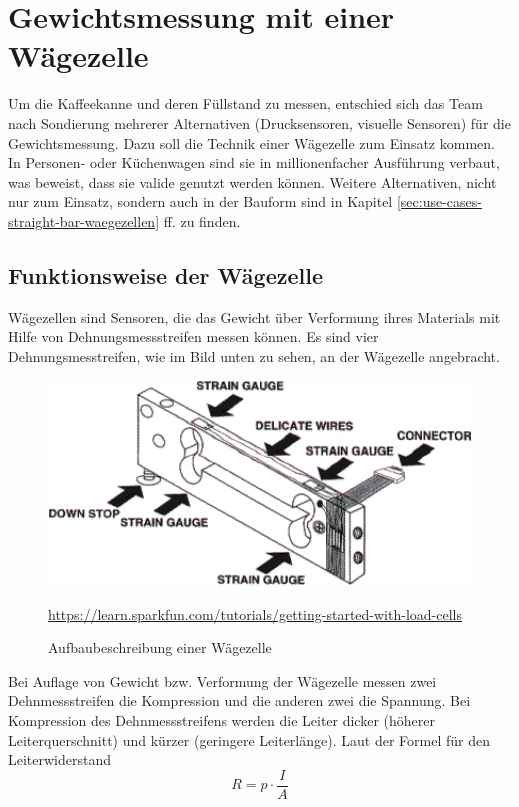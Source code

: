 \chapter{Gewichtsmessung mit einer Wägezelle}
Um die Kaffeekanne und deren Füllstand zu messen, entschied sich das Team nach Sondierung mehrerer Alternativen (Drucksensoren, visuelle Sensoren) für die Gewichtsmessung. Dazu soll die Technik einer Wägezelle zum Einsatz kommen. In Personen- oder Küchenwagen sind sie in millionenfacher Ausführung verbaut, was beweist, dass sie valide genutzt werden können. Weitere Alternativen, nicht nur zum Einsatz, sondern auch in der Bauform sind in Kapitel \ref{sec:use-cases-straight-bar-waegezellen} ff. zu finden.
\section{Funktionsweise der Wägezelle}
Wägezellen sind Sensoren, die das Gewicht über Verformung ihres Materials mit Hilfe von Dehnungsmessstreifen messen können. Es sind vier Dehnungsmesstreifen, wie im Bild unten zu sehen, an der Wägezelle angebracht.
\begin{figure}[H]
    \center
    \includegraphics[width=15cm]{Bilder/waegezelle-aufbaubeschreibung.jpg}\\
    \caption{Aufbaubeschreibung einer Wägezelle}
    \begin{flushleft} \quelle\url{https://learn.sparkfun.com/tutorials/getting-started-with-load-cells} \end{flushleft}
\end{figure}
\noindent
Bei Auflage von Gewicht bzw. Verformung der Wägezelle messen zwei Dehnmessstreifen die Kompression und die anderen zwei die Spannung. Bei Kompression des Dehnmessstreifens werden die Leiter dicker (höherer Leiterquerschnitt) und kürzer (geringere Leiterlänge). Laut der Formel für den Leiterwiderstand 
\begin{equation}
    R=p \cdot \frac{I}{A}
\end{equation}

